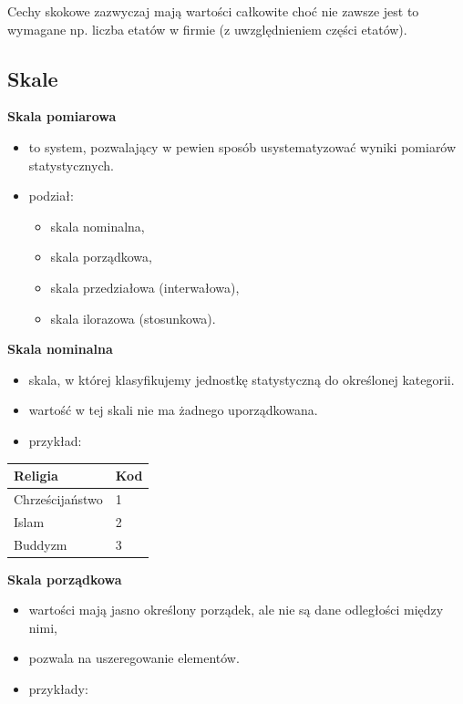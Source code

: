 \documentclass[
  letterpaper,
  DIV=11,
  numbers=noendperiod]{scrreprt}
\providecommand{\tightlist}{%
  \setlength{\itemsep}{0pt}\setlength{\parskip}{0pt}}\usepackage{longtable,booktabs,array}
\begin{document}
Cechy skokowe zazwyczaj mają wartości całkowite choć nie zawsze jest to
wymagane np. liczba etatów w firmie (z uwzględnieniem części etatów).

\subsection{Skale}\label{skale}

\textbf{Skala pomiarowa}

\begin{itemize}
\tightlist
\item
  to system, pozwalający w pewien sposób usystematyzować wyniki pomiarów
  statystycznych.
\item
  podział:

  \begin{itemize}
  \tightlist
  \item
    skala nominalna,
  \item
    skala porządkowa,
  \item
    skala przedziałowa (interwałowa),
  \item
    skala ilorazowa (stosunkowa).
  \end{itemize}
\end{itemize}

\textbf{Skala nominalna}

\begin{itemize}
\tightlist
\item
  skala, w której klasyfikujemy jednostkę statystyczną do określonej
  kategorii.
\item
  wartość w tej skali nie ma żadnego uporządkowana.
\item
  przykład:
\end{itemize}

\begin{longtable}[]{@{}ll@{}}
\toprule\noalign{}
Religia & Kod \\
\midrule\noalign{}
\endhead
\bottomrule\noalign{}
\endlastfoot
Chrześcijaństwo & 1 \\
Islam & 2 \\
Buddyzm & 3 \\
\end{longtable}

\textbf{Skala porządkowa}

\begin{itemize}
\tightlist
\item
  wartości mają jasno określony porządek, ale nie są dane odległości
  między nimi,
\item
  pozwala na uszeregowanie elementów.
\item
  przykłady:
\end{itemize}
\end{document}

